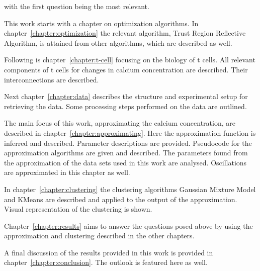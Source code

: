 with the first question being the most relevant.

\newpage
\noindent
This work starts with a chapter on optimization algorithms. In chapter~\ref{chapter:optimization} the relevant algorithm, Trust Region Reflective Algorithm, is attained from other algorithms, which are described as well.

Following is chapter~\ref{chapter:t-cell} focusing on the biology of t cells. All relevant components of t cells for changes in calcium concentration are described. Their interconnections are described.

Next chapter~\ref{chapter:data} describes the structure and experimental setup for retrieving the data. Some processing steps performed on the data are outlined.

The main focus of this work, approximating the calcium concentration, are described in chapter~\ref{chapter:approximating}. Here the approximation function is inferred and described. Parameter descriptions are provided. Pseudocode for the approximation algorithms are given and described. The parameters found from the approximation of the data sets used in this work are analysed. Oscillations are approximated in this chapter as well.

In chapter~\ref{chapter:clustering} the clustering algorithms Gaussian Mixture Model and KMeans are described and applied to the output of the approximation. Visual representation of the clustering is shown.

Chapter~\ref{chapter:results} aims to answer the questions posed above by using the approximation and clustering described in the other chapters.

A final discussion of the results provided in this work is provided in chapter~\ref{chapter:conclusion}. The outlook is featured here as well.